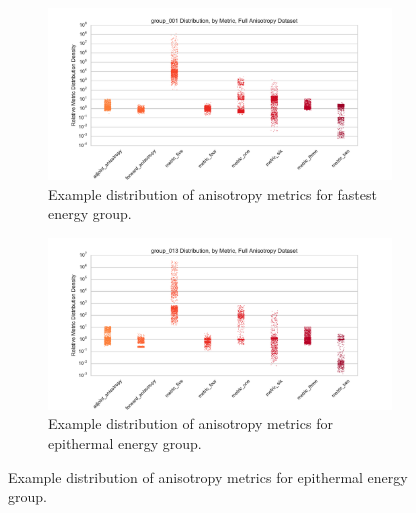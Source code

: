 \begin{figure}[htb!]
  \centering
  \begin{subfigure}[t]{\textwidth}
    \centering
    \includegraphics[width=0.95\linewidth]{./chapters/characterization_probs/figures/sample_data/group_001_strip_full.pdf}
    \caption{Example distribution of anisotropy metrics for fastest energy group.}
    \label{fig:samplestrip001}
  \end{subfigure}
  \begin{subfigure}[t]{\textwidth}
    \centering
    \includegraphics[width=0.95\linewidth]{./chapters/characterization_probs/figures/sample_data/group_013_strip_full.pdf}
    \caption{Example distribution of anisotropy metrics for epithermal energy group.}
    \label{fig:samplestrip013}
  \end{subfigure}
\end{figure}
